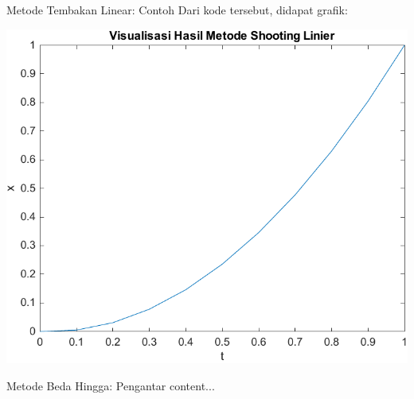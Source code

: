 \documentclass[xcolor={dvipsnames}, 9pt]{beamer}
\renewcommand{\emph}[1]{\textcolor{Blue}{#1}}
\begin{document}
    \begin{frame}{Metode Tembakan Linear: Contoh}
    	Dari kode tersebut, didapat grafik:
    	\begin{center}
    		\includegraphics[scale=0.4]{linearshooting.pdf}
    	\end{center}
    \end{frame}
    \begin{frame}{Metode Beda Hingga: Pengantar}
    	content...
    \end{frame}
\end{document}
